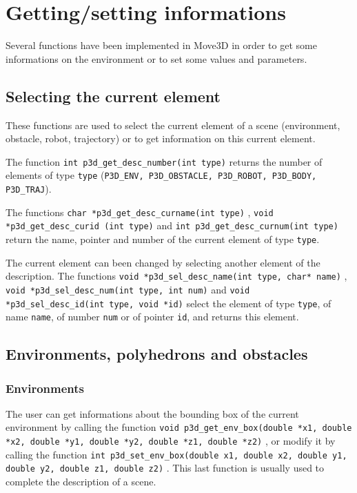 \chapter{Getting/setting informations}

Several functions have been implemented in Move3D in order to get some
informations on the environment or to set some values and parameters.

\section{Selecting the current element}

These functions are used to select the current element of a scene
(environment, obstacle, robot, trajectory) or to get information on
this current element.

The function {\tt int p3d\_get\_desc\_number(int type)}
 returns the
number of elements of type {\tt type} ({\tt P3D\_ENV,
P3D\_OBSTACLE, P3D\_ROBOT, P3D\_BODY, P3D\_TRAJ}).

The functions {\tt char *p3d\_get\_desc\_curname(int type)}
, {\tt void *p3d\_get\_desc\_curid (int
type)}  and {\tt int p3d\_get\_desc\_curnum(int
type)}  return the name, pointer and
number of the current element of type {\tt type}.

The current element can been changed by selecting another element of
the description.  The functions {\tt void *p3d\_sel\_desc\_name(int
type, char* name)} , {\tt void
*p3d\_sel\_desc\_num(int type, int num)} 
and {\tt void *p3d\_sel\_desc\_id(int type, void *id)}
 select the
element of type {\tt type}, of name {\tt name}, of number {\tt num} or
of pointer {\tt id}, and returns this element.

\section{Environments, polyhedrons and obstacles}

\subsection{Environments}

The user can get informations about the bounding box of the
current environment by calling the function {\tt void
p3d\_get\_env\_box(double *x1, double *x2, double *y1, double *y2,
double *z1, double *z2)} , or modify it by
calling the function {\tt int  p3d\_set\_env\_box(double x1, double
x2, double y1, double y2, double z1, double z2)}
.  This last function is usually used to
complete the description of a scene. 

